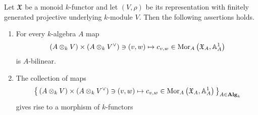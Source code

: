 \begin{proposition}\label{proposition:matrixcoefficientsnatural}
Let ${\mathfrak X}$ be a monoid $k$-functor and let $(V,\rho)$ be its representation with finitely generated projective underlying $k$-module $V$. Then the following assertions holds.
\begin{enumerate}[label=\emph{\textbf{(\arabic*)}}, leftmargin=3.0em]
\item For every $k$-algebra $A$ map
$$\left(A\otimes_kV\right)\times \left(A\otimes_kV^{\vee}\right)\ni (v,w)\mapsto c_{v,w}\in \mathrm{Mor}_A\left({\mathfrak X}_A,\mathbb{A}^1_A\right)$$
is $A$-bilinear.
\item The collection of maps
$$\big\{\left(A\otimes_kV\right)\times \left(A\otimes_kV^{\vee}\right)\ni (v,w)\mapsto c_{v,w}\in \mathrm{Mor}_A\left({\mathfrak X}_A,\mathbb{A}^1_A\right)\big\}_{A\in \mathbf{Alg}_k}$$
gives rise to a morphism of $k$-functors
\begin{center}
\end{center}
\end{enumerate}
\end{proposition}
